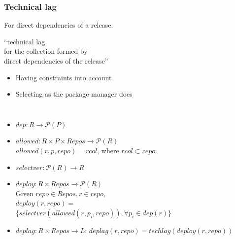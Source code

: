 \documentclass[17pt,aspectratio=169,hyperref=pdfusetitle]{beamer}
\begin{document}
\begin{frame}[fragile]
  \frametitle{Technical lag}

  For direct dependencies of a release:

  \vspace{.5cm}
  
  ``technical lag \\
  for the collection formed by \\
  direct dependencies of the release'' \\

  \vspace{.5cm}

  \begin{itemize}
  \item Having constraints into account
  \item Selecting as the package manager does
  \end{itemize}
\end{frame}

\begin{frame}[fragile]

  {\small
  \begin{columns}
    \column{\dimexpr\paperwidth-1.5cm}
  \begin{itemize}
  \item $dep: R \rightarrow \mathcal P \left({P}\right)$
  \item $allowed: R \times P \times Repos \rightarrow \mathcal P \left({R}\right)$ \\
    $allowed(r, p, repo) =  rcol$, where $rcol \subset repo$.
  \item $selectver: \mathcal P \left({R}\right) \rightarrow R$ 
  \item $deploy: R \times Repos \rightarrow \mathcal P \left({R}\right)$ \\
    Given $repo \in Repos, r \in repo$, \\
    $deploy(r, repo) =$ \\
    $\{ selectver(allowed(r, p_i, repo)), \forall p_i \in dep(r) \} $
  \item $deplag: R \times Repos \rightarrow L$: $deplag(r, repo) = techlag(deploy(r, repo))$
  \end{itemize}    
  \end{columns}
  }
\end{frame}

\end{document}
